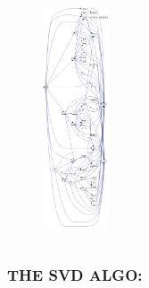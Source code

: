 \documentclass[a4paper,8pt]{beamer} %
\begin{document}
\begin{frame}
\begin{columns}[l]
%
\column{2.8cm}
%
\begin{figure}%
\begin{center}
\includegraphics[height=6.5cm]{callg_dsyev.png} 
\end{center}
\end{figure}
%
\end{columns}
\end{frame}%

\begin{frame} \frametitle{THE SVD ALGO:}
\end{frame}%




\end{document}
